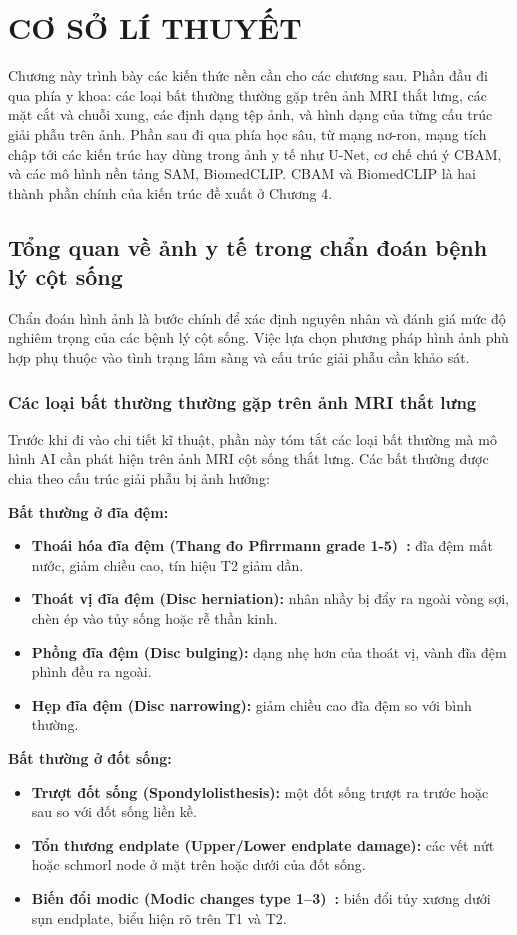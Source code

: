\chapter{CƠ SỞ LÍ THUYẾT}

Chương này trình bày các kiến thức nền cần cho các chương sau. Phần đầu đi qua phía y khoa: các loại bất thường thường gặp trên ảnh MRI thắt lưng, các mặt cắt và chuỗi xung, các định dạng tệp ảnh, và hình dạng của từng cấu trúc giải phẫu trên ảnh. Phần sau đi qua phía học sâu, từ mạng nơ-ron, mạng tích chập tới các kiến trúc hay dùng trong ảnh y tế như U-Net, cơ chế chú ý CBAM, và các mô hình nền tảng SAM, BiomedCLIP. CBAM và BiomedCLIP là hai thành phần chính của kiến trúc đề xuất ở Chương 4.

\section{Tổng quan về ảnh y tế trong chẩn đoán bệnh lý cột sống}
Chẩn đoán hình ảnh là bước chính để xác định nguyên nhân và đánh giá mức độ nghiêm trọng của các bệnh lý cột sống. Việc lựa chọn phương pháp hình ảnh phù hợp phụ thuộc vào tình trạng lâm sàng và cấu trúc giải phẫu cần khảo sát.

\subsection{Các loại bất thường thường gặp trên ảnh MRI thắt lưng}
Trước khi đi vào chi tiết kĩ thuật, phần này tóm tắt các loại bất thường mà mô hình AI cần phát hiện trên ảnh MRI cột sống thắt lưng. Các bất thường được chia theo cấu trúc giải phẫu bị ảnh hưởng:

\textbf{Bất thường ở đĩa đệm:}
\begin{itemize}
    \item \textbf{Thoái hóa đĩa đệm (Thang đo Pfirrmann grade 1-5)~\cite{pfirrmann2001grading}:} đĩa đệm mất nước, giảm chiều cao, tín hiệu T2 giảm dần.
    \item \textbf{Thoát vị đĩa đệm (Disc herniation):} nhân nhầy bị đẩy ra ngoài vòng sợi, chèn ép vào tủy sống hoặc rễ thần kinh.
    \item \textbf{Phồng đĩa đệm (Disc bulging):} dạng nhẹ hơn của thoát vị, vành đĩa đệm phình đều ra ngoài.
    \item \textbf{Hẹp đĩa đệm (Disc narrowing):} giảm chiều cao đĩa đệm so với bình thường.
\end{itemize}

\textbf{Bất thường ở đốt sống:}
\begin{itemize}
    \item \textbf{Trượt đốt sống (Spondylolisthesis):} một đốt sống trượt ra trước hoặc sau so với đốt sống liền kề.
    \item \textbf{Tổn thương endplate (Upper/Lower endplate damage):} các vết nứt hoặc schmorl node ở mặt trên hoặc dưới của đốt sống.
    \item \textbf{Biến đổi modic (Modic changes type 1--3)~\cite{modic1988degenerative}:} biến đổi tủy xương dưới sụn endplate, biểu hiện rõ trên T1 và T2.
\end{itemize}

